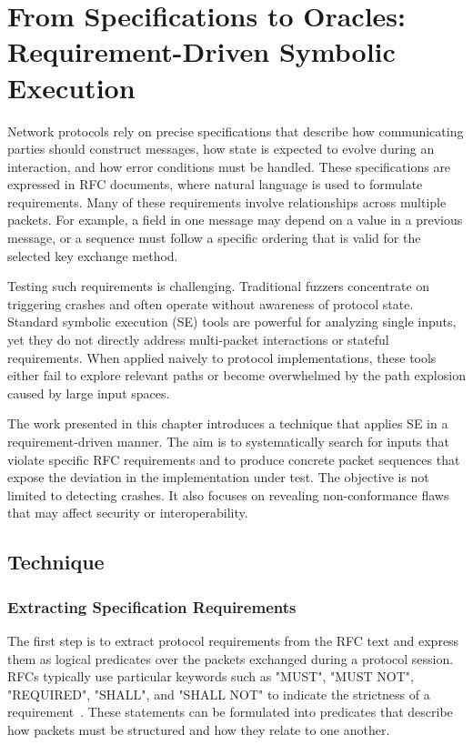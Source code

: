 \chapter{From Specifications to Oracles: Requirement-Driven Symbolic Execution}\label{chapter:paper1}
Network protocols rely on precise specifications that describe how communicating parties should construct messages, how state is expected to evolve during an interaction, and how error conditions must be handled.
These specifications are expressed in RFC documents, where natural language is used to formulate requirements.
Many of these requirements involve relationships across multiple packets.
For example, a field in one message may depend on a value in a previous message, or a sequence must follow a specific ordering that is valid for the selected key exchange method.

Testing such requirements is challenging. 
Traditional fuzzers concentrate on triggering crashes and often operate without awareness of protocol state.
Standard symbolic execution (SE) tools are powerful for analyzing single inputs, yet they do not directly address multi-packet interactions or stateful requirements.
When applied naively to protocol implementations, these tools either fail to explore relevant paths or become overwhelmed by the path explosion caused by large input spaces.

The work presented in this chapter introduces a technique that applies SE in a requirement-driven manner.
The aim is to systematically search for inputs that violate specific RFC requirements and to produce concrete packet sequences that expose the deviation in the implementation under test.
The objective is not limited to detecting crashes. 
It also focuses on revealing non-conformance flaws that may affect security or interoperability.
\section{Technique}
\subsection{Extracting Specification Requirements}\label{sec:extract-req}
The first step is to extract protocol requirements from the RFC text and express them as logical predicates over the packets exchanged during a protocol session.
RFCs typically use particular keywords such as "MUST", "MUST NOT", "REQUIRED", "SHALL", and "SHALL NOT" to indicate the strictness of a requirement~\cite{RFC2119}.
These statements can be formulated into predicates that describe how packets must be structured and how they relate to one another.

